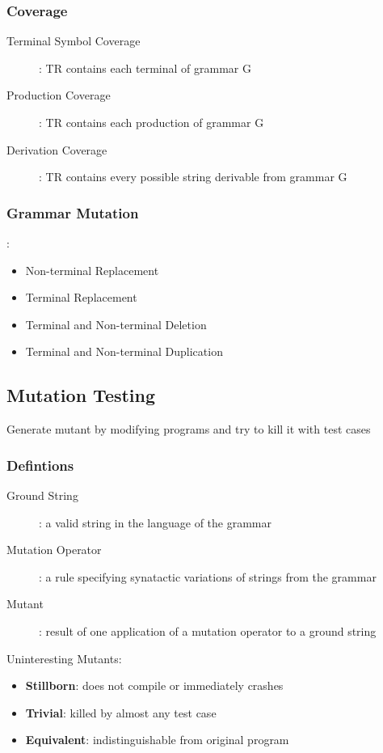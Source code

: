 \documentclass[]{article}
\theoremstyle{definition}
\begin{document}
				\subsubsection{Coverage}
					\begin{description}
						\item[Terminal Symbol Coverage]: TR contains each terminal of grammar G
						\item[Production Coverage]: TR contains each production of grammar G
						\item[Derivation Coverage]: TR contains every possible string derivable from grammar G
					\end{description}
				\subsubsection{Grammar Mutation}:
					\begin{itemize}
						\item Non-terminal Replacement
						\item Terminal Replacement
						\item Terminal and Non-terminal Deletion
						\item Terminal and Non-terminal Duplication
					\end{itemize}
			\subsection{Mutation Testing}
				Generate mutant by modifying programs and try to kill it with test cases 
				\subsubsection{Defintions}
					\begin{description}
						\item[Ground String]: a valid string in the language of the grammar
						\item[Mutation Operator]: a rule specifying synatactic variations of strings from the grammar
						\item[Mutant]: result of one application of a mutation operator to a ground string
					\end{description}
					Uninteresting Mutants:
					\begin{itemize}
						\item \textbf{Stillborn}: does not compile or immediately crashes
						\item \textbf{Trivial}: killed by almost any test case
						\item \textbf{Equivalent}: indistinguishable from original program
					\end{itemize}
\end{document}
